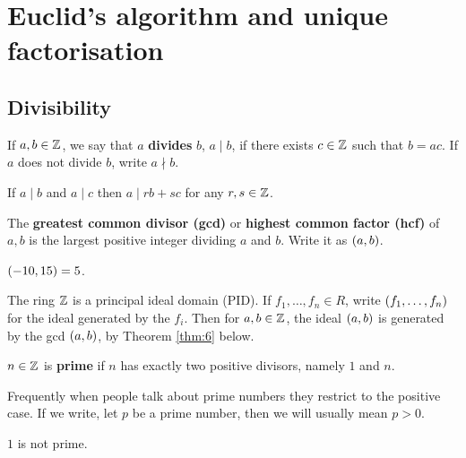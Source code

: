 \pagebreak

\section{Euclid's algorithm and unique factorisation}

\subsection{Divisibility}

\begin{definition}
If $ a, b \in \mathbb{Z} $, we say that $ a $ \textbf{divides} $ b $, $ a \mid b $, if there exists $ c \in \mathbb{Z} $ such that $ b = ac $. If $ a $ does not divide $ b $, write $ a \nmid b $.
\end{definition}

If $ a \mid b $ and $ a \mid c $ then $ a \mid rb + sc $ for any $ r, s \in \mathbb{Z} $.

\begin{definition}
The \textbf{greatest common divisor (gcd)} or \textbf{highest common factor (hcf)} of $ a, b $ is the largest positive integer dividing $ a $ and $ b $. Write it as $ \left( a, b \right) $.
\end{definition}

\begin{example*}
$ \left( -10, 15 \right) = 5 $.
\end{example*}

\begin{note*}
The ring $ \mathbb{Z} $ is a principal ideal domain (PID). If $ f_1, \dots, f_n \in R $, write $ \left( f_1, \dots, f_n \right) $ for the ideal generated by the $ f_i $. Then for $ a, b \in \mathbb{Z} $, the ideal $ \left( a, b \right) $ is generated by the gcd $ \left( a, b \right) $, by Theorem \ref{thm:6} below.
\end{note*}

\begin{definition}
$ n \in \mathbb{Z} $ is \textbf{prime} if $ n $ has exactly two positive divisors, namely $ 1 $ and $ n $.
\end{definition}

\begin{note*}
Frequently when people talk about prime numbers they restrict to the positive case. If we write, let $ p $ be a prime number, then we will usually mean $ p > 0 $.
\end{note*}

\begin{note*}
$ 1 $ is not prime.
\end{note*}

